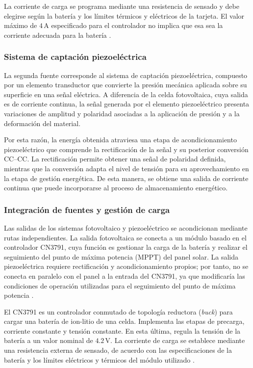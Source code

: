 \documentclass[11pt]{article}
\begin{document}
La corriente de carga se programa mediante una resistencia de sensado y
debe elegirse según la batería y los límites térmicos y
eléctricos de la tarjeta. El valor máximo de \(4\,\mathrm{A}\) especificado
para el controlador no implica que esa sea la corriente adecuada para la
batería \cite{consonance_cn3791_datasheet}.

\subsubsection{Sistema de captación piezoeléctrica}

La segunda fuente corresponde al sistema de captación piezoeléctrica, compuesto por un elemento transductor que convierte la presión mecánica aplicada sobre su superficie en una señal eléctrica. A diferencia de la celda fotovoltaica, cuya salida es de corriente continua, la señal generada por el elemento piezoeléctrico presenta variaciones de amplitud y polaridad asociadas a la aplicación de presión y a la deformación del material.

Por esta razón, la energía obtenida atraviesa una etapa de acondicionamiento piezoeléctrico que comprende la rectificación de la señal y su posterior conversión CC--CC. La rectificación permite obtener una señal de polaridad definida, mientras que la conversión adapta el nivel de tensión para su aprovechamiento en la etapa de gestión energética. De esta manera, se obtiene una salida de corriente continua que puede incorporarse al proceso de almacenamiento energético.

\subsubsection{Integración de fuentes y gestión de carga}

Las salidas de los sistemas fotovoltaico y piezoeléctrico se acondicionan
mediante rutas independientes. La salida fotovoltaica se conecta a un módulo
basado en el controlador CN3791, cuya función es gestionar la carga de la
batería y realizar el seguimiento del punto de máxima potencia (MPPT) del
panel solar. La salida piezoeléctrica requiere rectificación y
acondicionamiento propios; por tanto, no se conecta en paralelo con el panel
a la entrada del CN3791, ya que modificaría las condiciones de operación
utilizadas para el seguimiento del punto de máxima potencia
\cite{consonance_cn3791_datasheet}.

El CN3791 es un controlador conmutado de topología reductora (\textit{buck})
para cargar una batería de ion-litio de una celda. Implementa las etapas de
precarga, corriente constante y tensión constante. En esta última, regula la
tensión de la batería a un valor nominal de \(4.2\,\mathrm{V}\). La corriente
de carga se establece mediante una resistencia externa de sensado, de acuerdo
con las especificaciones de la batería y los límites eléctricos y térmicos
del módulo utilizado \cite{consonance_cn3791_datasheet}.
\end{document}
